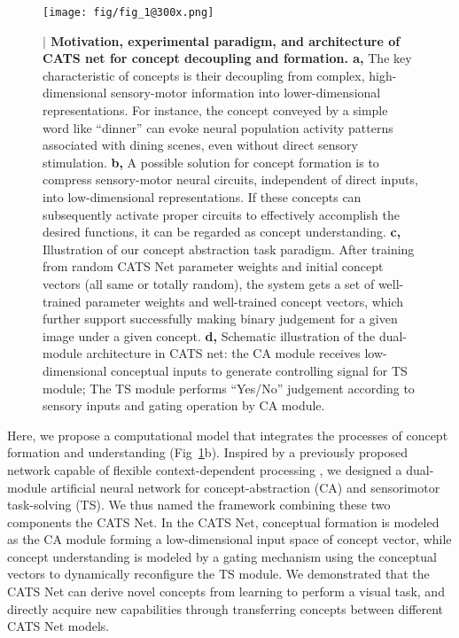 \documentclass[pdflatex,sn-mathphys-num,lineno]{sn-jnl}%
\begin{document}
\begin{CJK}{UTF8}{gbsn}
\begin{figure}[htbp]
\centering
\texttt{[image: fig/fig\_1@300x.png]}
\caption{\textbf{$\vert$ Motivation, experimental paradigm, and architecture of CATS net for concept decoupling and  formation. a,} The key characteristic of concepts is their decoupling from complex, high-dimensional sensory-motor information into lower-dimensional representations. For instance, the concept conveyed by a simple word like “dinner” can evoke neural population activity patterns associated with dining scenes, even without direct sensory stimulation. \textbf{b,}  A possible solution for concept formation is to compress sensory-motor neural circuits, independent of direct inputs, into low-dimensional representations. If these concepts can subsequently activate proper circuits to effectively accomplish the desired functions, it can be regarded as concept understanding. \textbf{c,} Illustration of our concept abstraction task paradigm. After training from random CATS Net parameter weights and initial concept vectors (all same or totally random), the system gets a set of well-trained parameter weights and well-trained concept vectors, which further support successfully making binary judgement for a given image under a given concept. \textbf{d,} Schematic illustration of the dual-module architecture in CATS net: the CA module receives low-dimensional conceptual inputs to generate controlling signal for TS module; The TS module performs “Yes/No” judgement according to sensory inputs and gating operation by CA module.}
\label{fig1}
\end{figure}

Here, we propose a computational model that integrates the processes of concept formation and understanding (Fig~\ref{fig1}b). Inspired by a previously proposed network capable of flexible context-dependent processing \cite{zeng_continual_2019}, we designed a dual-module artificial neural network for concept-abstraction (CA) and sensorimotor task-solving (TS). We thus named the framework combining these two components the CATS Net. In the CATS Net, conceptual formation is modeled as the CA module forming a low-dimensional input space of concept vector, while concept understanding is modeled by a gating mechanism using the conceptual vectors to dynamically reconfigure the TS module. We demonstrated that the CATS Net can derive novel concepts from learning to perform a visual task, and directly acquire new capabilities through transferring concepts between different CATS Net models.


\end{CJK}
\end{document}
